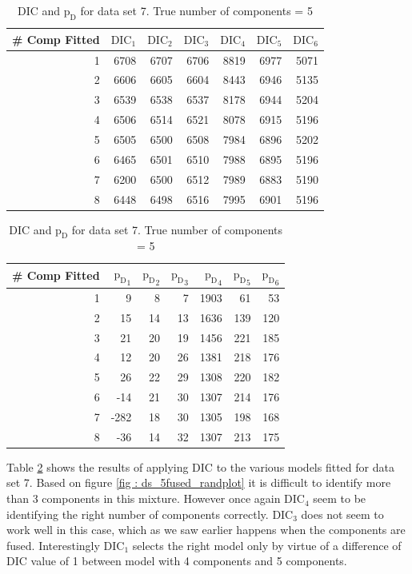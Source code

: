 \begin{table}[!htb]
\centering
\captionsetup{justification=centering}
\caption{DIC and $\text{p}_\text{D}$ for data set 7. True number of components = 5}
\label{table : ds_5fused_dic}
\begin{tabular}{@{}rrrrrrr@{}}
\toprule
\# Comp Fitted & $\text{DIC}_1$ & $\text{DIC}_2$  & $\text{DIC}_3$  & $\text{DIC}_4$  & $\text{DIC}_5$  & $\text{DIC}_6$  \\ \midrule
1 & 6708 & 6707 & 6706 & 8819 & 6977 & 5071 \\
2 & 6606 & 6605 & 6604 & 8443 & 6946 & 5135 \\
3 & 6539 & 6538 & 6537 & 8178 & 6944 & 5204 \\
4 & 6506 & 6514 & 6521 & 8078 & 6915 & 5196 \\
5 & 6505 & 6500 & 6508 & 7984 & 6896 & 5202 \\
6 & 6465 & 6501 & 6510 & 7988 & 6895 & 5196 \\
7 & 6200 & 6500 & 6512 & 7989 & 6883 & 5190 \\
8 & 6448 & 6498 & 6516 & 7995 & 6901 & 5196 \\ \bottomrule
\end{tabular}

\begin{tabular}{@{}rrrrrrr@{}}
\toprule
\# Comp Fitted & ${\text{p}_\text{D}}_1$ & ${\text{p}_\text{D}}_2$ & ${\text{p}_\text{D}}_3$ & ${\text{p}_\text{D}}_4$ & ${\text{p}_\text{D}}_5$ & ${\text{p}_\text{D}}_6$ \\ \midrule
1 & 9 & 8 & 7 & 1903 & 61 & 53 \\
2 & 15 & 14 & 13 & 1636 & 139 & 120 \\
3 & 21 & 20 & 19 & 1456 & 221 & 185 \\
4 & 12 & 20 & 26 & 1381 & 218 & 176 \\
5 & 26 & 22 & 29 & 1308 & 220 & 182 \\
6 & -14 & 21 & 30 & 1307 & 214 & 176 \\
7 & -282 & 18 & 30 & 1305 & 198 & 168 \\
8 & -36 & 14 & 32 & 1307 & 213 & 175 \\ \bottomrule
\end{tabular}
\end{table}

Table \ref{table : ds_5fused_dic} shows the results of applying DIC to the various models fitted for data set 7. Based on figure \ref{fig : ds_5fused_randplot} it is difficult to identify more than 3 components in this mixture. However once again $\text{DIC}_4$ seem to be identifying the right number of components correctly. $\text{DIC}_3$ does not seem to work well in this case, which as we saw earlier happens when the components are fused. Interestingly $\text{DIC}_1$ selects the right model only by virtue of a difference of DIC value of 1 between model with 4 components and 5 components.\\

